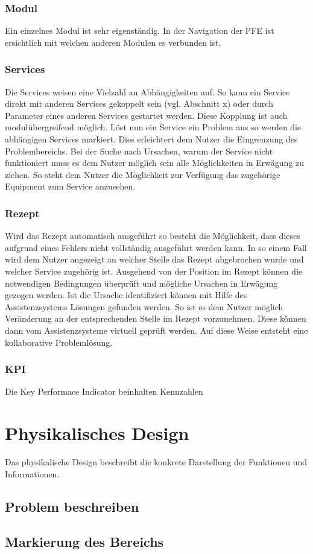 \subsubsection*{Modul}
Ein einzelnes Modul ist sehr eigenständig. In der Navigation der PFE ist ersichtlich mit welchen anderen Modulen es verbunden ist.

\subsubsection*{Services}
Die Services weisen eine Vielzahl an Abhängigkeiten auf. So kann ein Service direkt mit anderen Services gekoppelt sein (vgl. Abschnitt x) oder durch Parameter eines anderen Services gestartet werden. Diese Kopplung ist auch modulübergreifend möglich. Löst nun ein Service ein Problem aus so werden die abhängigen Services markiert. Dies erleichtert dem Nutzer die Eingrenzung des Problembereichs. Bei der Suche nach Ursachen, warum der Service nicht funktioniert muss es dem Nutzer möglich sein alle Möglichkeiten in Erwägung zu ziehen. So steht dem Nutzer die Möglichkeit zur Verfügung das zugehörige Equipment zum Service anzusehen. 

\subsubsection*{Rezept}
Wird das Rezept automatisch ausgeführt so besteht die Möglichkeit, dass dieses aufgrund eines Fehlers nicht vollständig ausgeführt werden kann. In so einem Fall wird dem Nutzer angezeigt an welcher Stelle das Rezept abgebrochen wurde und welcher Service zugehörig ist. Ausgehend von der Position im Rezept können die notwendigen Bedingungen überprüft und mögliche Ursachen in Erwägung gezogen werden. Ist die Ursache identifiziert können mit Hilfe des Assistenzsystems Lösungen gefunden werden. So ist es dem Nutzer möglich Veränderung an der entsprechenden Stelle im Rezept vorzunehmen. Diese können dann vom Assistenzsysteme virtuell geprüft werden. Auf diese Weise entsteht eine kollaborative Problemlösung.

\subsubsection*{KPI}
Die Key Performace Indicator beinhalten Kennzahlen 


\section{Physikalisches Design}
Das physikalische Design beschreibt die konkrete Darstellung der Funktionen und Informationen.

\subsection{Problem beschreiben}


\subsection{Markierung des Bereichs}
